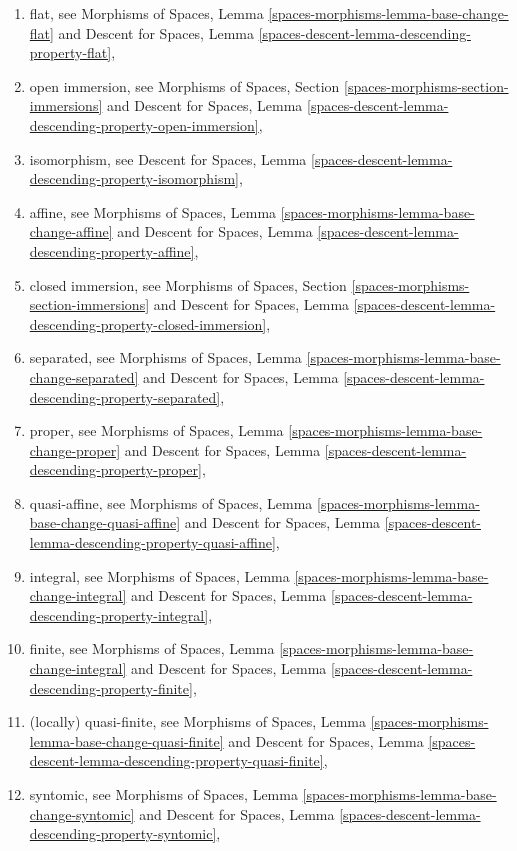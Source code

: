 \begin{enumerate}
\item flat, see
Morphisms of Spaces,
Lemma \ref{spaces-morphisms-lemma-base-change-flat}
and
Descent for Spaces,
Lemma \ref{spaces-descent-lemma-descending-property-flat},
\item open immersion, see
Morphisms of Spaces,
Section \ref{spaces-morphisms-section-immersions}
and
Descent for Spaces,
Lemma \ref{spaces-descent-lemma-descending-property-open-immersion},
\item isomorphism, see
Descent for Spaces,
Lemma \ref{spaces-descent-lemma-descending-property-isomorphism},
\item affine, see
Morphisms of Spaces,
Lemma \ref{spaces-morphisms-lemma-base-change-affine}
and
Descent for Spaces,
Lemma \ref{spaces-descent-lemma-descending-property-affine},
\item closed immersion, see
Morphisms of Spaces, Section \ref{spaces-morphisms-section-immersions}
and
Descent for Spaces,
Lemma \ref{spaces-descent-lemma-descending-property-closed-immersion},
\item separated, see
Morphisms of Spaces,
Lemma \ref{spaces-morphisms-lemma-base-change-separated}
and
Descent for Spaces,
Lemma \ref{spaces-descent-lemma-descending-property-separated},
\item proper, see
Morphisms of Spaces,
Lemma \ref{spaces-morphisms-lemma-base-change-proper}
and
Descent for Spaces,
Lemma \ref{spaces-descent-lemma-descending-property-proper},
\item quasi-affine, see
Morphisms of Spaces,
Lemma \ref{spaces-morphisms-lemma-base-change-quasi-affine}
and
Descent for Spaces,
Lemma \ref{spaces-descent-lemma-descending-property-quasi-affine},
\item integral, see
Morphisms of Spaces,
Lemma \ref{spaces-morphisms-lemma-base-change-integral}
and
Descent for Spaces,
Lemma \ref{spaces-descent-lemma-descending-property-integral},
\item finite, see
Morphisms of Spaces,
Lemma \ref{spaces-morphisms-lemma-base-change-integral}
and
Descent for Spaces,
Lemma \ref{spaces-descent-lemma-descending-property-finite},
\item (locally) quasi-finite, see
Morphisms of Spaces,
Lemma \ref{spaces-morphisms-lemma-base-change-quasi-finite}
and
Descent for Spaces,
Lemma \ref{spaces-descent-lemma-descending-property-quasi-finite},
\item syntomic, see
Morphisms of Spaces,
Lemma \ref{spaces-morphisms-lemma-base-change-syntomic}
and
Descent for Spaces,
Lemma \ref{spaces-descent-lemma-descending-property-syntomic},

\end{enumerate}
